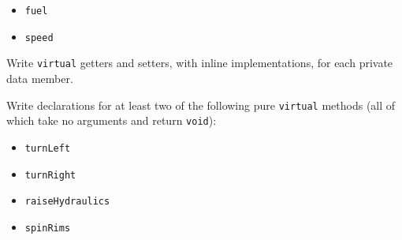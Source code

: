 \begin{itemize}
  \item \texttt{fuel}
  \item \texttt{speed}
\end{itemize}

Write \texttt{virtual} getters and setters, with inline
implementations, for each private data member.

Write declarations for at least two of the following pure
\texttt{virtual} methods (all of which take no arguments and return
\texttt{void}):
\begin{itemize}
  \item \texttt{turnLeft}
  \item \texttt{turnRight}
  \item \texttt{raiseHydraulics}
  \item \texttt{spinRims}
\end{itemize}

\newpage

\textQuestion{\makePageQuadrilleRuled}



